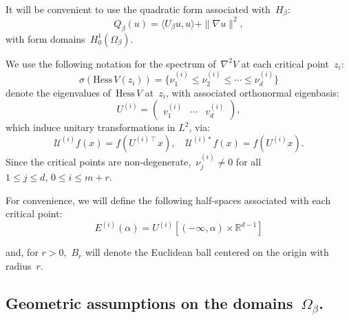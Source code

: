 \documentclass[10pt]{article}
\newcommand{\R}{\mathbb{R}}
\newcommand{\Hess}{\mathrm{Hess}\,}
\newcommand{\1}{\mathbbm 1}
\newcommand{\hessPassage}[2][]{U^{(#2)#1}} %
\newcommand{\hessEigvec}[2]{v^{(#1)}_{#2}} %
\newcommand{\hessEigval}[2]{\nu^{(#1)}_{#2}} %
\newcommand{\halfSpace}[1]{E^{(#1)}}
\begin{document}
    It will be convenient to use the quadratic form associated with~$H_\beta$:
    \begin{equation}
        \label{eq:witten_quad_form}
        Q_\beta(u) = \langle U_\beta u ,u \rangle + \|\nabla u\|^2,
    \end{equation}
    with form domains~$H_0^1(\Omega_\beta)$.

    We use the following notation for the spectrum of~$\nabla^2 V$ at each critical point~$z_i$:
    \[\sigma(\Hess V(z_i)) = \{\hessEigval{i}{1} \leq \hessEigval{i}{2} \leq \dotsm \leq \hessEigval{i}{d}\}\]
    denote the eigenvalues of~$\Hess V$ at~$z_i$, with associated orthonormal eigenbasis:
    \[U^{(i)} =\begin{pmatrix}\hessEigvec{i}{1}&\dotsm&\hessEigvec{i}{d}\end{pmatrix},\]
    which induce unitary transformations in $L^2$, via:
   ~\begin{equation}
    \label{eq:}
     \mathcal U^{(i)} f(x) = f\left( U^{(i)\intercal}x\right),\quad \mathcal U^{(i)*} f(x) = f\left( U^{(i)}x\right).
   \end{equation}
    Since the critical points are non-degenerate,~$\nu_j^{(i)} \neq 0$ for all~$1\leq j\leq d,\,0\leq i \leq m+r$.

    For convenience, we will define the following half-spaces associated with each critical point:
    \begin{equation}
        \label{eq:half_space}
        \halfSpace{i}(\alpha) = \hessPassage{i}\left[(-\infty,\alpha)\times\R^{d-1}\right]
    \end{equation}

    and, for $r>0$,~$B_r$ will denote the Euclidean ball centered on the origin with radius~$r$.
    \subsection{Geometric assumptions on the domains~$\Omega_\beta$.\newline}
    \label{subsect:harm_hypotheses}
\end{document}
